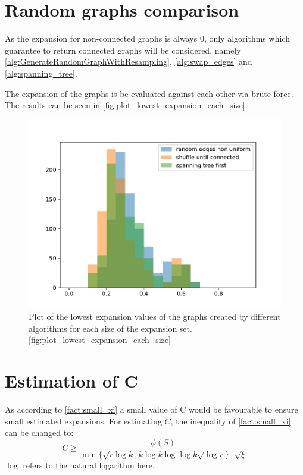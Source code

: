 \section{Random graphs comparison}
As the expansion for non-connected graphs is always 0, only algorithms which guarantee to return connected graphs will be considered, namely \ref{alg:GenerateRandomGraphWithResampling}, \ref{alg:swap_edges} and \ref{alg:spanning_tree}.

The expansion of the graphs is be evaluated against each other via brute-force. The results can be seen in \cref{fig:plot_lowest_expansion_each_size}.

\begin{figure}
	\centering
	\includegraphics[scale=1]{figures/creation_algorithm_log_lowest_expansion.pdf}
	\caption[Plot lowest expansion for different algorithms]{Plot of the lowest expansion values of the graphs created by different algorithms for each size of the expansion set. \cref{fig:plot_lowest_expansion_each_size}}
\end{figure}

\section{Estimation of C}
As according to \cref{fact:small_xi} a small value of C would be favourable to ensure small estimated expansions. 
For estimating $C$, the inequality of \cref{fact:small_xi} can be changed to:
\begin{equation} \label{eq:c_estimate}
C\ge \frac {\phi(S)}{ \min\{\sqrt{r \log k}, k \log k  \log \log k \sqrt{\log r} \} \cdot \sqrt{\xi}}
\end{equation} $\log$ refers to the natural logarithm here.


